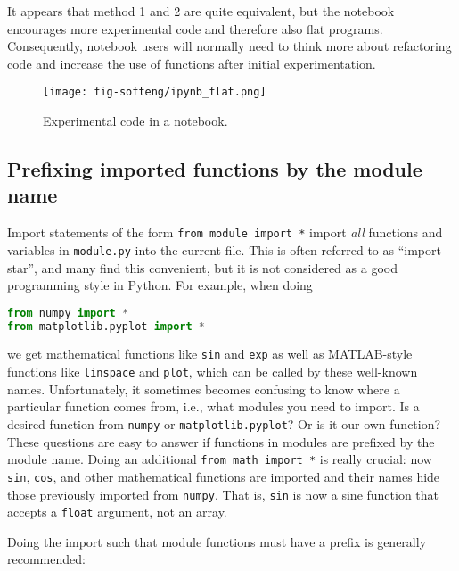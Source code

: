 \documentclass[graybox,sectrefs,envcountresetchap,open=right,final]{svmonodo}
\begin{document}
\noindent
It appears that method 1 and 2 are quite equivalent, but the notebook
encourages more experimental code and therefore also flat programs.
Consequently, notebook users will normally need to think more about
refactoring code and increase the use of functions after initial
experimentation.


\begin{figure}[!ht]  %
  \centerline{\texttt{[image: fig-softeng/ipynb\_flat.png]}}
  \caption{
  Experimental code in a notebook. \label{softeng1:ipynb}
  }
\end{figure}



\subsection{Prefixing imported functions by the module name}
\label{softeng1:basic:modprefix}


Import statements of the form \texttt{from module import *} import
\emph{all} functions and variables in \texttt{module.py} into the current file.
This is often referred to as ``import star'', and
many find this convenient, but it is not considered as a good
programming style in Python.
For example, when doing

\begin{lstlisting}[language=Python,style=blue1_bluegreen]
from numpy import *
from matplotlib.pyplot import *
\end{lstlisting}
we get mathematical functions like \texttt{sin} and \texttt{exp} as well as
MATLAB-style functions like \texttt{linspace} and \texttt{plot}, which can be called
by these well-known names.  Unfortunately, it sometimes becomes
confusing to know where a particular function comes from, i.e., what
modules you need to import. Is a desired function from \texttt{numpy} or
\texttt{matplotlib.pyplot}? Or is it our own function?  These questions are
easy to answer if functions in modules are prefixed by the module
name. Doing an additional \texttt{from math import *} is really crucial: now
\texttt{sin}, \texttt{cos}, and other mathematical functions are imported and their
names hide those previously imported from \texttt{numpy}.  That is, \texttt{sin} is
now a sine function that accepts a \texttt{float} argument, not an array.

Doing the import such that module functions must have a prefix
is generally recommended:
\end{document}
